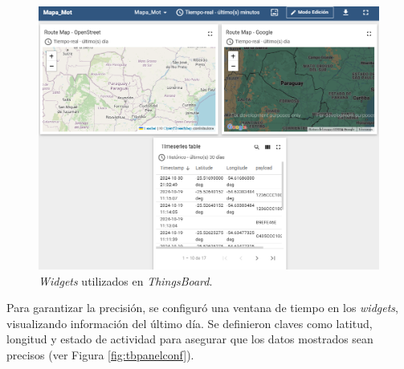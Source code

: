 \begin{figure}[H]
\leavevmode
\begin{minipage}{\textwidth}
\begin{center}
\includegraphics[width=\textwidth]{./capitulo_04/imagen/tb/dahboard.png}
\caption{\textit{Widgets} utilizados en \textit{ThingsBoard}. \label{fig:tbdahsboards}}
\end{center}
\end{minipage}
\end{figure}

Para garantizar la precisión, se configuró una ventana de tiempo en los \textit{widgets}, visualizando información del último día. Se definieron claves como latitud, longitud y estado de actividad para asegurar que los datos mostrados sean precisos (ver Figura \ref{fig:tbpanelconf}).

